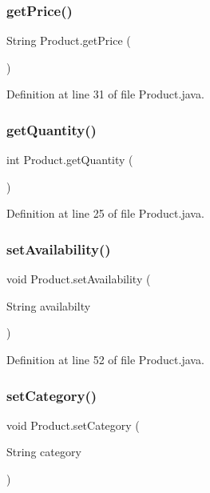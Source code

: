 \subsubsection{\texorpdfstring{getPrice()}{getPrice()}}
{\footnotesize\ttfamily String Product.\+get\+Price (\begin{DoxyParamCaption}{ }\end{DoxyParamCaption})}



Definition at line 31 of file Product.\+java.

\mbox{\label{class_product_a46e0266bf10d4fe4972eea290d59b783}} 
\subsubsection{\texorpdfstring{getQuantity()}{getQuantity()}}
{\footnotesize\ttfamily int Product.\+get\+Quantity (\begin{DoxyParamCaption}{ }\end{DoxyParamCaption})}



Definition at line 25 of file Product.\+java.

\mbox{\label{class_product_aff893d8ef6f6f70bc70c5a99bb1049a3}} 
\subsubsection{\texorpdfstring{setAvailability()}{setAvailability()}}
{\footnotesize\ttfamily void Product.\+set\+Availability (\begin{DoxyParamCaption}\item[{String}]{availabilty }\end{DoxyParamCaption})}



Definition at line 52 of file Product.\+java.

\mbox{\label{class_product_a2403ef234d4f53d97d2e4535aa076e8d}} 
\subsubsection{\texorpdfstring{setCategory()}{setCategory()}}
{\footnotesize\ttfamily void Product.\+set\+Category (\begin{DoxyParamCaption}\item[{String}]{category }\end{DoxyParamCaption})}



